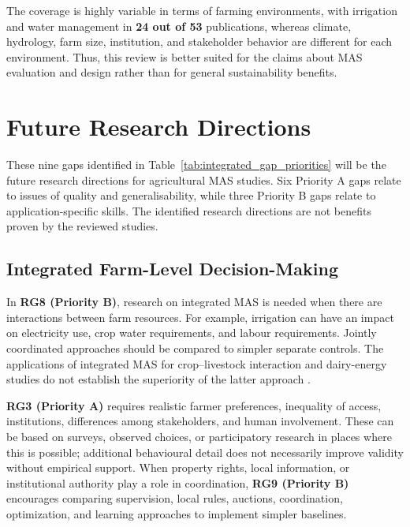 \documentclass[11pt,a4paper]{article}
\begin{document}
The coverage is highly variable in terms of farming environments,
with irrigation and water management in \textbf{24 out of 53} publications, whereas climate, hydrology, farm size, institution, and stakeholder behavior are different for each environment. Thus, this review is better suited for the claims about MAS evaluation and design rather than for general sustainability
benefits.




\section{Future Research Directions}

These nine gaps identified in Table~\ref{tab:integrated_gap_priorities} will be the future research directions for agricultural MAS studies. Six Priority A gaps relate to issues of quality and generalisability, while three Priority B gaps relate to application-specific skills. The identified research directions are not benefits proven by the reviewed studies.

\subsection{Integrated Farm-Level Decision-Making}

In \textbf{RG8 (Priority B)}, research on integrated MAS is needed when there
are interactions between farm resources. For example, irrigation can have an impact on electricity use, crop water requirements, and labour requirements. Jointly coordinated approaches should be compared to simpler separate controls. The applications of integrated MAS for crop--livestock interaction and dairy-energy studies do not establish the superiority of the latter approach \parencite{catarino_fostering_2021,shah_peer--peer_2024}.

\textbf{RG3 (Priority A)} requires realistic farmer preferences, inequality of access, institutions, differences among stakeholders, and human involvement. These can be based on surveys, observed choices, or participatory research in places where this is possible; additional behavioural detail does not necessarily improve validity without empirical support. When property rights, local information, or institutional authority play a role in coordination, \textbf{RG9 (Priority B)} encourages comparing supervision, local rules, auctions, coordination, optimization, and learning approaches to implement simpler baselines.
\end{document}

